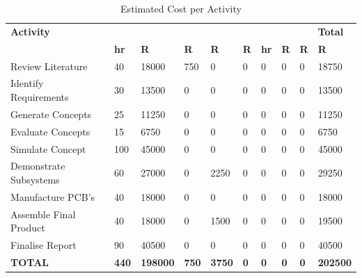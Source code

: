 \documentclass[12pt,a4paper]{report}
\begin{document}
	\begin{table}[H]
		\centering
		\caption{Estimated Cost per Activity}
		\label{tab:costs}
		\scriptsize
		\setlength{\tabcolsep}{3pt}
		\renewcommand{\arraystretch}{1.2}
		
		\begin{tabular}{|p{2.8cm}|p{0.8cm}|p{1.1cm}|p{1.2cm}|p{1.1cm}|p{1.2cm}|p{0.8cm}|p{1.1cm}|p{1.2cm}|p{1.2cm}|}
			\hline
			\textbf{Activity} &
			 &
			\textbf{} &
			\textbf{} &
			\textbf{} &
			 &
			\textbf{} &
			\textbf{Total} \\
			& \centering\textbf{hr} & \centering\textbf{R}
			& \centering\textbf{R}
			& \centering\textbf{R}
			& \centering\textbf{R}
			& \centering\textbf{hr}
			& \centering\textbf{R}
			& \centering\textbf{R}
			& \centering\textbf{R} \tabularnewline
			\hline
			Review Literature & 40 & 18000 & 750 & 0 & 0 & 0 & 0 & 0 & 18750 \\
			Identify Requirements & 30 & 13500 & 0 & 0 & 0 & 0 & 0 & 0 & 13500 \\
			Generate Concepts & 25 & 11250 & 0 & 0 & 0 & 0 & 0 & 0 & 11250 \\
			Evaluate Concepts & 15 & 6750 & 0 & 0 & 0 & 0 & 0 & 0 & 6750 \\
			Simulate Concept & 100 & 45000 & 0 & 0 & 0 & 0 & 0 & 0 & 45000 \\
			Demonstrate Subsystems & 60 & 27000 & 0 & 2250 & 0 & 0 & 0 & 0 & 29250 \\
			Manufacture PCB's & 40 & 18000 & 0 & 0 & 0 & 0 & 0 & 0 & 18000 \\
			Assemble Final Product & 40 & 18000 & 0 & 1500 & 0 & 0 & 0 & 0 & 19500 \\
			Finalise Report & 90 & 40500 & 0 & 0 & 0 & 0 & 0 & 0 & 40500 \\
			\hline
			\textbf{TOTAL} & \textbf{440} & \textbf{198000} & \textbf{750} & \textbf{3750} & \textbf{0} & \textbf{0} & \textbf{0} & \textbf{0} & \textbf{202500} \\
			\hline
		\end{tabular}
	\end{table}
	
\end{document}
